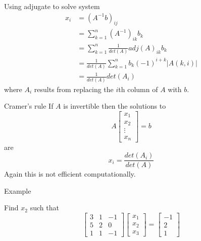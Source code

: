 \documentclass{beamer}
\begin{document}
\begin{frame}{Using adjugate to solve system}
  \begin{align*}
    x_i &= (A^{-1}b)_{ij}\\
        &= \sum_{k=1}^n(A^{-1})_{ik}b_k\\
        &= \sum_{k=1}^n\frac{1}{det(A)}adj(A)_{ik}b_k\\
        &= \frac{1}{det(A)}\sum_{k=1}^nb_k(-1)^{i+k}\left|A(k, i)\right|\\
        &= \frac{1}{det(A)}det(A_i)
  \end{align*}
  where $A_i$ results from replacing the $i$th column of $A$ with $b$.
\end{frame}

\begin{frame}{Cramer's rule}
  If $A$ is invertible then the solutions to
  \begin{equation*}
    A \left[
      \begin{array}{c}
        x_1\\
        x_2\\
        \vdots\\
        x_n
      \end{array}
    \right] = b
  \end{equation*}
  are
  \begin{equation*}
    x_i = \frac{det(A_i)}{det(A)}
  \end{equation*}
  Again this is not efficient computationally.
\end{frame}

\begin{frame}{Example}
  \begin{example}
    Find $x_2$ such that
    \begin{equation*}
      \left[
	\begin{array}{ccc}
          3&1&-1\\
          5&2&0\\
          1&1&-1
	\end{array}
      \right]
      \left[
          \begin{array}{c}
            x_1\\
            x_2\\
            x_3
          \end{array}
        \right]=
        \left[
          \begin{array}{c}
            -1\\
            2\\
            1
          \end{array}
        \right]
    \end{equation*}
  \end{example}
\end{frame}
\end{document}
